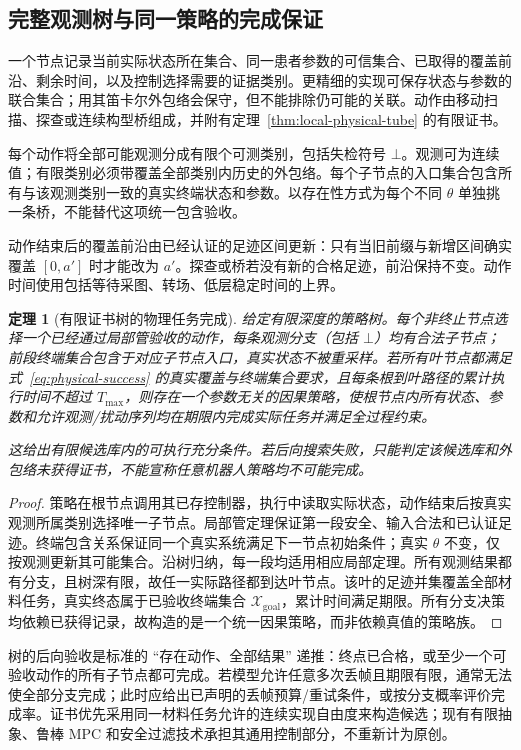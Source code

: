 \documentclass[UTF8,fontset=fandol,zihao=5,a4paper]{ctexart}
\newtheorem{theorem}{定理}[section]
\theoremstyle{definition}
\theoremstyle{remark}\newtheorem{remark}[theorem]{说明}
\numberwithin{equation}{section}
\begin{document}
\subsection{完整观测树与同一策略的完成保证}

一个节点记录当前实际状态所在集合、同一患者参数的可信集合、已取得的覆盖前沿、剩余时间，以及控制选择需要的证据类别。更精细的实现可保存状态与参数的联合集合；用其笛卡尔外包络会保守，但不能排除仍可能的关联。动作由移动扫描、探查或连续构型桥组成，并附有定理~\ref{thm:local-physical-tube} 的有限证书。

每个动作将全部可能观测分成有限个可测类别，包括失检符号 \(\bot\)。观测可为连续值；有限类别必须带覆盖全部类别内历史的外包络。每个子节点的入口集合包含所有与该观测类别一致的真实终端状态和参数。以存在性方式为每个不同 \(\theta\) 单独挑一条桥，不能替代这项统一包含验收。

动作结束后的覆盖前沿由已经认证的足迹区间更新：只有当旧前缀与新增区间确实覆盖 \([0,a']\) 时才能改为 \(a'\)。探查或桥若没有新的合格足迹，前沿保持不变。动作时间使用包括等待采图、转场、低层稳定时间的上界。

\begin{theorem}[有限证书树的物理任务完成]
\label{thm:finite-physical-completion}
给定有限深度的策略树。每个非终止节点选择一个已经通过局部管验收的动作，每条观测分支（包括 \(\bot\)）均有合法子节点；前段终端集合包含于对应子节点入口，真实状态不被重采样。若所有叶节点都满足式~\eqref{eq:physical-success} 的真实覆盖与终端集合要求，且每条根到叶路径的累计执行时间不超过 \(T_{\max}\)，则存在一个参数无关的因果策略，使根节点内所有状态、参数和允许观测/扰动序列均在期限内完成实际任务并满足全过程约束。

这给出有限候选库内的可执行充分条件。若后向搜索失败，只能判定该候选库和外包络未获得证书，不能宣称任意机器人策略均不可能完成。
\end{theorem}
\begin{proof}
策略在根节点调用其已存控制器，执行中读取实际状态，动作结束后按真实观测所属类别选择唯一子节点。局部管定理保证第一段安全、输入合法和已认证足迹。终端包含关系保证同一个真实系统满足下一节点初始条件；真实 \(\theta\) 不变，仅按观测更新其可能集合。沿树归纳，每一段均适用相应局部定理。所有观测结果都有分支，且树深有限，故任一实际路径都到达叶节点。该叶的足迹并集覆盖全部材料任务，真实终态属于已验收终端集合 \(\mathcal X_{\mathrm{goal}}\)，累计时间满足期限。所有分支决策均依赖已获得记录，故构造的是一个统一因果策略，而非依赖真值的策略族。
\end{proof}

树的后向验收是标准的 ``存在动作、全部结果'' 递推：终点已合格，或至少一个可验收动作的所有子节点都可完成。若模型允许任意多次丢帧且期限有限，通常无法使全部分支完成；此时应给出已声明的丢帧预算/重试条件，或按分支概率评价完成率。证书优先采用同一材料任务允许的连续实现自由度来构造候选；现有有限抽象、鲁棒 MPC 和安全过滤技术承担其通用控制部分，不重新计为原创。
\end{document}

